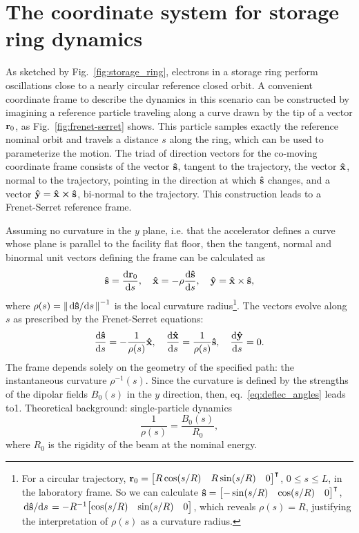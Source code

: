 \section{The coordinate system for storage ring dynamics}
As sketched by Fig.~\ref{fig:storage_ring}, electrons in a storage ring perform oscillations close to a nearly circular reference closed orbit. A convenient coordinate frame to describe the dynamics in this scenario can be constructed by imagining a reference particle traveling along a curve drawn by the tip of a vector $\vb{r}_0$, as Fig.~\ref{fig:frenet-serret} shows. This particle samples exactly the reference nominal orbit and travels a distance $s$ along the ring, which can be used to parameterize the motion. The triad of direction vectors for the co-moving coordinate frame consists of the vector $\vu{s}$, tangent to the trajectory, the vector $\vu{x}$, normal to the trajectory, pointing in the direction at which $\vu{s}$ changes, and a vector $\vu{y}=\vu{x}\cross\vu{s}$, bi-normal to the trajectory. This construction leads to a Frenet-Serret reference frame.

Assuming no curvature in the $y$ plane, i.e. that the accelerator defines a curve whose plane is parallel to the facility flat floor, then the tangent, normal and binormal unit vectors defining the frame can be calculated as \cite{lee_accelerator_2004}
\begin{equation}
\vu{s}=\dv{\vb{r}_{0}}{s}, \quad \vu{x}=-\rho\dv{\vu{s}}{s}, \quad \vu{y} =  \vu{x}\times\vu{s},
\end{equation}
where $\rho(s) = \norm{\dv*{\vu{s}}{s}}^{-1}$ is the local curvature radius\footnote{For a circular trajectory, $\vb{r}_0 = \mqty[R\cos(s/R) & R\sin(s/R) & 0]^\intercal$, $ 0\leq s \leq L$, in the laboratory frame. So we can calculate $\vu{s}=\mqty[-\sin(s/R) & \cos(s/R) & 0]^\intercal$, $\dv*{\vu{s}}{s} = -R^{-1}\mqty[\cos(s/R) & \sin(s/R) & 0]$, which reveals $\rho(s)=R$, justifying the interpretation of $\rho(s)$ as a curvature radius.}. The vectors evolve along $s$ as prescribed by the Frenet-Serret equations:
\begin{equation}
\dv{\vu{s}}{s}=-\frac{1}{\rho(s)}\vu{x}, \quad\dv{\vu{x}}{s}=\frac{1}{\rho(s)}\vu{s}, \quad \dv{\vu{y}}{s}=0.
\end{equation}
The frame depends solely on the geometry of the specified path: the instantaneous curvature $\rho^{-1}(s)$. Since the curvature is defined by the strengths of the dipolar fields $B_0(s)$ in the $y$ direction, then, eq.~\eqref{eq:deflec_angles} leads to1. Theoretical background: single-particle dynamics
    \begin{equation}
        \frac{1}{\rho(s)} = \frac{B_0(s)}{R_0},
        \label{eq:G}
    \end{equation}
where $R_0$ is the rigidity of the beam at the nominal energy.

